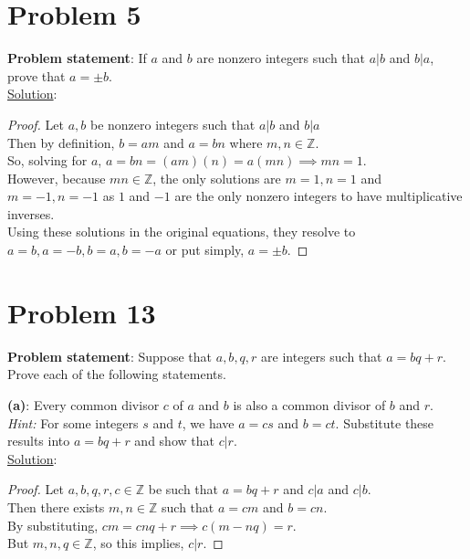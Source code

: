 \documentclass{article} %
\begin{document}
\newpage

\section*{Problem 5}


\textbf{Problem statement}: If $a$ and $b$ are nonzero integers such that $a|b$ and $b|a$, prove that $a = \pm b$.
\\

\underline{Solution}: 
\begin{addmargin}[1em]{0em}
\begin{proof}
Let $a, b$ be nonzero integers such that $a|b$ and $b|a$
\\Then by definition, $b = am$ and $a = bn$ where $m,n \in \mathbb{Z}$.
\\So, solving for $a$, $a = bn = (am)(n) = a(mn) \implies mn = 1$.
\\However, because $mn \in \mathbb{Z}$, the only solutions are $m = 1, n = 1$ and $m = -1, n = -1$ as $1$ and $-1$ are the only nonzero integers to have multiplicative inverses.
\\Using these solutions in the original equations, they resolve to $a = b, a = -b, b = a, b = -a$ or put simply, $a = \pm b$.
\end{proof}
\end{addmargin}

\newpage

\section*{Problem 13}


\textbf{Problem statement}: Suppose that $a, b, q, r$ are integers such that $a = bq + r$.  Prove each of the following statements.
\\

\begin{addmargin}[1em]{0em}
\textbf{(a)}: Every common divisor $c$ of $a$ and $b$ is also a common divisor of $b$ and $r$.
\\ \hfill \break
\textit{Hint:} For some integers $s$ and $t$, we have $a = cs$ and $b = ct$.  Substitute these results into $a = bq + r$ and show that $c|r$.
\\ \hfill \break
\underline{Solution}:
\begin{addmargin}[1em]{0em}
\begin{proof}
Let $a, b, q, r, c \in \mathbb{Z}$ be such that $a = bq + r$ and $c|a$ and $c|b$.
\\Then there exists $m, n \in \mathbb{Z}$ such that $a = cm$ and $b = cn$.
\\By substituting, $cm = cnq + r \implies c(m-nq) = r$.
\\But $m,n,q \in \mathbb{Z}$, so this implies, $c|r$.
\end{proof}
\end{addmargin}
\end{addmargin}
\hfill \break
\end{document}
